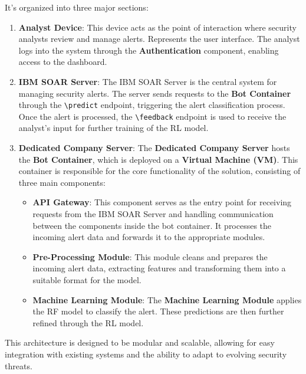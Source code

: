 It's organized into three major sections:
\begin{enumerate}
    \item \textbf{Analyst Device}: This device acts as the point of interaction where security analysts review and manage alerts. Represents the user interface. The analyst logs into the system through the \textbf{Authentication} component, enabling access to the dashboard.
    
    \item \textbf{IBM SOAR Server}: The IBM SOAR Server is the central system for managing security alerts. The server sends requests to the \textbf{Bot Container} through the \texttt{\textbackslash predict} endpoint, triggering the alert classification process. Once the alert is processed, the \texttt{\textbackslash feedback} endpoint is used to receive the analyst's input for further training of the RL model.
    
    \item \textbf{Dedicated Company Server}: The \textbf{Dedicated Company Server} hosts the \textbf{Bot Container}, which is deployed on a \textbf{Virtual Machine (VM)}. This container is responsible for the core functionality of the solution, consisting of three main components:
    \begin{itemize}
        \item \textbf{API Gateway}: This component serves as the entry point for receiving requests from the IBM SOAR Server and handling communication between the components inside the bot container. It processes the incoming alert data and forwards it to the appropriate modules.
        \item \textbf{Pre-Processing Module}: This module cleans and prepares the incoming alert data, extracting features and transforming them into a suitable format for the model.
        \item \textbf{Machine Learning Module}: The \textbf{Machine Learning Module} applies the \gls{RF} model to classify the alert. These predictions are then further refined through the \gls{RL} model.
    \end{itemize}
\end{enumerate}

This architecture is designed to be modular and scalable, allowing for easy integration with existing systems and the ability to adapt to evolving security threats.



